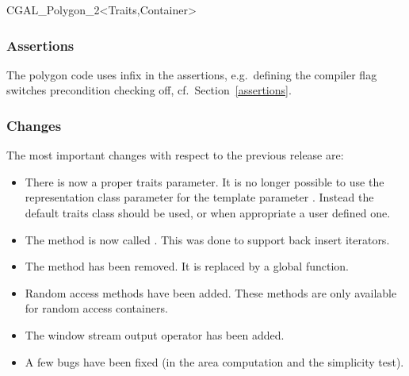 \begin{ccClassTemplate}{CGAL_Polygon_2<Traits,Container>}
\subsubsection*{Assertions}
The polygon code uses infix  in the assertions,
e.g.\ defining the compiler flag
 switches precondition
checking off, cf.~Section~\ref{assertions}.

\subsubsection*{Changes}
The most important changes with respect to the previous release are:

\begin{itemize}
\item There is now a proper traits parameter. It is no longer possible to use
the representation class  parameter for the template parameter .
Instead the default traits class  should be used,
or when appropriate a user defined one.

\item The method  is now called . This was done to
support back insert iterators.

\item The  method has been removed. It is replaced by
a global  function.

\item Random access methods have been added. These methods are only available
for random access containers.

\item The window stream output operator has been added.

\item A few bugs have been fixed (in the area computation and the simplicity test).
\end{itemize}



\end{ccClassTemplate}
